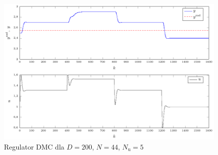 \begin{figure}[tb] 
\centering 
\includegraphics[scale=1]{rysunki/zapisz_pdf/DMC_D=200.000_N=44.00_Nu=5.00.pdf} 
\caption{Regulator DMC dla $D=200$, $N=44$, $N_{\mathrm{u}}=5$} 
\label{r_pgfplots_DMC_D=200.000_N=44.00_Nu=5.00} 
\end{figure}